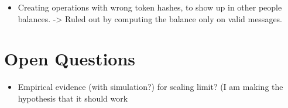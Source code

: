 \documentclass[sigplan,screen,10pt]{acmart}
\begin{document}
\begin{itemize}
	\item Creating operations with wrong token hashes, to show up in other people balances. -> Ruled out by computing the balance only on valid messages.
\end{itemize}



\section{Open Questions}

\begin{itemize}
\item Empirical evidence (with simulation?) for scaling limit? (I am making the hypothesis that it should work 
\end{itemize}
\end{document}
